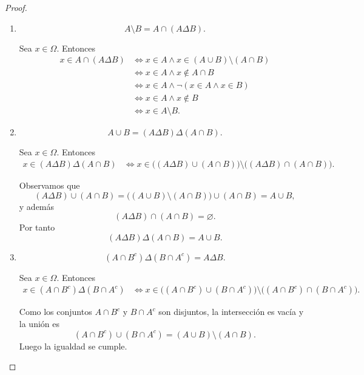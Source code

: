 \documentclass[12pt,a4paper]{article}
\begin{document}
\begin{proof}
\begin{enumerate}[label=(\alph*)]
            \item
            \[
                A\setminus B = A\cap(A\Delta B).
            \]
    
            Sea $x\in\Omega$. Entonces
            \begin{align*}
                x\in A\cap(A\Delta B)
                &\iff x\in A \land x\in (A\cup B)\setminus(A\cap B) \\
                &\iff x\in A \land x\notin A\cap B \\
                &\iff x\in A \land \neg(x\in A \land x\in B) \\
                &\iff x\in A \land x\notin B \\
                &\iff x\in A\setminus B.
            \end{align*}
    
            \item
            \[
                A\cup B = (A\Delta B)\Delta(A\cap B).
            \]
    
            Sea $x\in\Omega$. Entonces
            \begin{align*}
                x\in (A\Delta B)\Delta(A\cap B)
                &\iff x\in \big((A\Delta B)\cup(A\cap B)\big)
                \setminus \big((A\Delta B)\cap(A\cap B)\big).
            \end{align*}
    
            Observamos que
            \[
                (A\Delta B)\cup(A\cap B)
                = \big((A\cup B)\setminus(A\cap B)\big)\cup(A\cap B)
                = A\cup B,
            \]
            y además
            \[
                (A\Delta B)\cap(A\cap B)=\varnothing.
            \]
            Por tanto
            \[
                (A\Delta B)\Delta(A\cap B)=A\cup B.
            \]
    
            \item
            \[
                (A\cap B^c)\Delta(B\cap A^c)=A\Delta B.
            \]
    
            Sea $x\in\Omega$. Entonces
            \begin{align*}
                x\in (A\cap B^c)\Delta(B\cap A^c)
                &\iff x\in \big((A\cap B^c)\cup(B\cap A^c)\big)
                \setminus\big((A\cap B^c)\cap(B\cap A^c)\big).
            \end{align*}
    
            Como los conjuntos $A\cap B^c$ y $B\cap A^c$ son disjuntos,
            la intersección es vacía y la unión es
            \[
                (A\cap B^c)\cup(B\cap A^c)
                = (A\cup B)\setminus(A\cap B).
            \]
            Luego la igualdad se cumple.
    

\end{enumerate}
\end{proof}
\end{document}
